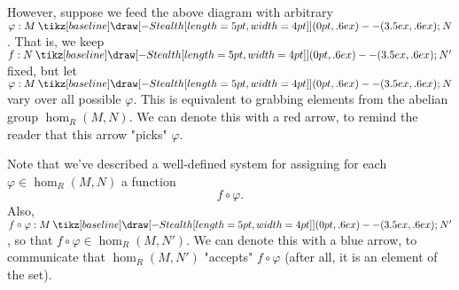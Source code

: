 \documentclass[12pt,letterpaper]{algebra_book}
\renewcommand{\to}{\mathbin{\tikz[baseline] \draw[-{Stealth[length=5pt,width=4pt]}] (0pt,.6ex) -- (3.5ex,.6ex);}}
\renewcommand{\phi}{\varphi}
\theoremstyle{definition}
\begin{document}
\begin{minipage}{0.6\textwidth}
    However, suppose we feed the above diagram with arbitrary $\phi: M
    \to N$. That is, we keep $f: N \to N'$ fixed, but let $\phi: M
    \to 
    N$ vary over all possible $\phi$. This is equivalent to grabbing
    elements from the abelian group $\hom_R(M, N)$. We can denote
    this with a red arrow, to remind the reader that this arrow
    "picks" $\phi$. 
\end{minipage}
\hfill
\begin{minipage}{0.4\textwidth}
    \begin{center}
    \end{center}
\end{minipage}

\begin{minipage}{0.6\textwidth}
    Note that we've described a well-defined system for assigning for each $\phi
    \in \hom_R(M, N)$ a function 
    \[ 
        f \circ \phi.
    \] 
    Also, $f \circ \phi
    : M \to N'$, so that $f \circ \phi \in \hom_R(M, N')$. We can
    denote this with a blue arrow, to communicate that
    $\hom_R(M,N')$ "accepts" $f \circ \phi$ (after all, it is an element of
    the set).
\end{minipage}
\hfill
\begin{minipage}{0.4\textwidth}
    \begin{center}
    \end{center}
\end{minipage}
\vspace{0.5cm}
\end{document}
